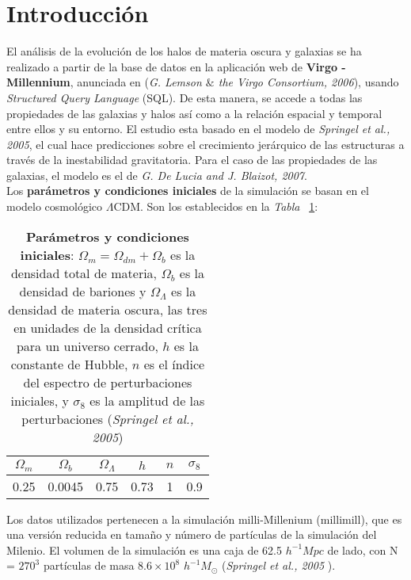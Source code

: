 \section{Introducción} 
\label{sec:1} %

El análisis de la evolución de los halos de materia oscura y galaxias se ha realizado a partir de la base de datos en la aplicación web de \textbf{Virgo - Millennium}\cite{6}, anunciada en (\textit{G. Lemson $\&$ the Virgo Consortium, 2006}\cite{5}), usando \textit{Structured Query Language} (SQL). De esta manera, se accede a todas las propiedades de las galaxias y halos así como a la relación espacial y temporal entre ellos y su entorno. El estudio esta basado en el modelo de \textit{Springel et al., 2005}\cite{1}, el cual hace predicciones sobre el crecimiento jerárquico de las estructuras a través de la inestabilidad gravitatoria. Para el caso de las propiedades de las galaxias, el modelo es el de \textit{G. De Lucia and J. Blaizot, 2007}\cite{2}.\\ 

 Los \textbf{parámetros y condiciones iniciales} de la simulación se basan en el modelo cosmológico $\Lambda$CDM. Son los establecidos en la \textit{Tabla} ~\ref{tab:tabla1}: 
 
\begin{table}[H]
\begin{center}
\begin{tabular}{c|c|c|c|c|c}
\toprule
\cellcolor[gray]{0.9}\large{$\Omega_m$} & \cellcolor[gray]{0.9}\large{$\Omega_b$} & \cellcolor[gray]{0.9}\large{$\Omega_\Lambda$} & \cellcolor[gray]{0.9}\large{$h$} & \cellcolor[gray]{0.9}\large{$n$}& \cellcolor[gray]{0.9}\large{$\sigma_8$}\\
\midrule
0.25 & 0.0045 & 0.75 & 0.73 & 1 & 0.9 \\
\bottomrule
\end{tabular}
\end{center}
\caption{\textbf{Parámetros y condiciones iniciales}: $\Omega_m = \Omega_{dm} + \Omega_b$ es la densidad total de materia, $\Omega_b$ es la densidad de bariones y $\Omega_\Lambda$ es la densidad de materia oscura, las tres en unidades de la densidad crítica para un universo cerrado, $h$ es la constante de Hubble, $n$ es el índice del espectro de perturbaciones iniciales, y $\sigma_8$ es la amplitud de las perturbaciones (\textit{Springel et al., 2005}\cite{1})}
\label{tab:tabla1}
\end{table}

Los datos utilizados pertenecen a la simulación milli-Millenium (millimill), que es una versión reducida en tamaño y número de partículas de la simulación del Milenio. El volumen de la simulación es una caja de 62.5 $h^{-1}Mpc$ de lado, con N = $270^{3}$ partículas de masa $8.6\times 10^8$ $h^{-1}M_\odot$ (\textit{Springel et al., 2005}\cite{1} \cite{7}). \\

